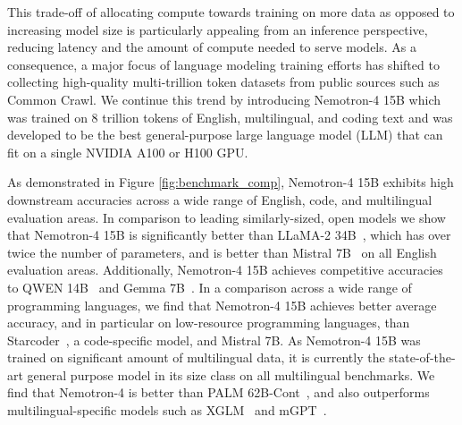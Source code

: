 \documentclass[11pt]{article}
\newcommand{\ours}{Nemotron-4}
\begin{document}
This trade-off of allocating compute towards training on more data as opposed to increasing model size is particularly appealing from an inference perspective, reducing latency and the amount of compute needed to serve models. As a consequence, a major focus of language modeling training efforts has shifted to collecting high-quality multi-trillion token datasets from public sources such as Common Crawl. We continue this trend by introducing \ours{} 15B which was trained on 8 trillion tokens of English, multilingual, and coding text and was developed to be the best general-purpose large language model (LLM) that can fit on a single NVIDIA A100 or H100 GPU.



As demonstrated in Figure \ref{fig:benchmark_comp}, \ours{} 15B exhibits high downstream accuracies across a wide range of English, code, and multilingual evaluation areas. In comparison to leading similarly-sized, open models we show that \ours{} 15B is significantly better than LLaMA-2 34B~\citep{touvron2023llama2}, which has over twice the number of parameters, and is better than Mistral 7B~\citep{jiang2023mistral} on all English evaluation areas. Additionally, \ours{} 15B achieves competitive accuracies to QWEN 14B~\citep{bai2023qwen} and Gemma 7B~\citep{gemma24}. In a comparison across a wide range of programming languages, we find that \ours{} 15B achieves better average accuracy, and in particular on low-resource programming languages, than Starcoder~\citep{li2023starcoder}, a code-specific model, and Mistral 7B. As \ours{} 15B was trained on significant amount of multilingual data, it is currently the state-of-the-art general purpose model in its size class on all multilingual benchmarks. We find that \ours{} is better than PALM 62B-Cont~\citep{palm2}, and also outperforms multilingual-specific models such as XGLM~\citep{lin2022fewshot} and mGPT~\citep{shliazhko2022mgpt}.


\end{document}

